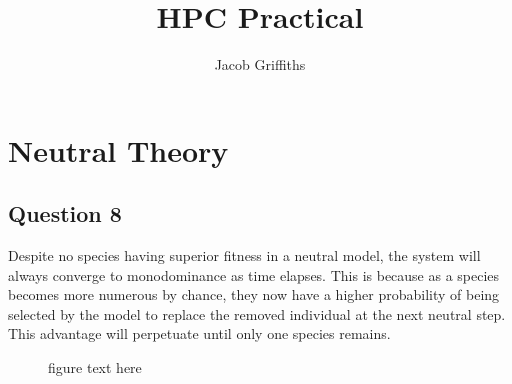 \documentclass{article}
\begin{document}
\title{HPC Practical{}}
\author{Jacob Griffiths}

\maketitle

\section{Neutral Theory}

\subsection{Question 8}
Despite no species having superior fitness in a neutral model, 
the system will always converge to monodominance
as time elapses. This is because as a species becomes more
numerous by chance, they now have a higher probability of 
being selected by the model to replace the removed individual at
the next neutral step. This advantage will perpetuate until only 
one species remains.

\begin{figure}[!htb]
    \caption{\label{fig:my-label} figure text here}
  \end{figure}
\end{document}
